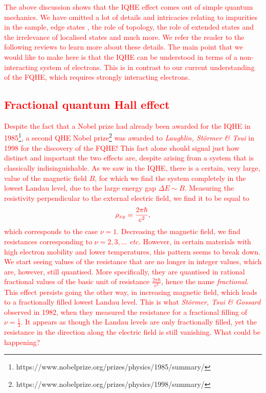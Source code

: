  \textcolor{red}{The above discussion shows that the IQHE effect comes out of simple quantum mechanics. We have omitted a lot of details and intricacies relating to impurities in the sample, edge states \cite{PhysRevB.25.2185}, the role of topology, the role of extended states and the irrelevance of locali\textcolor{red}{s}ed states \cite{PhysRevB.23.5632} and much more. We refer the reader to the following reviews \cite{hep-th/0509216, yoshioka2002the, Girvin} to learn more about these details. The main point that we would like to make here is that the IQHE can be understood in terms of a non-interacting system of electrons. This is in contrast to our current understanding of the FQHE, which requires strongly interacting electrons.}


 \textcolor{red}{\subsection{Fractional quantum Hall effect}}

 \textcolor{red}{Despite the fact that a Nobel prize had already been awarded for the IQHE in 1985\footnote[1]{https://www.nobelprize.org/prizes/physics/1985/summary/}, a second QHE Nobel prize\footnote[2]{https://www.nobelprize.org/prizes/physics/1998/summary/} was awarded to \textit{Laughlin, Störmer \& Tsui} \cite{Laughlin:1983fy, PhysRevLett.48.1559} in 1998 for the discovery of the FQHE! This fact alone should signal just how distinct and important the two effects are, despite arising from a system that is classically indisinguishable. As we saw in the IQHE, there is a certain, very large, value of the magnetic field $B$, for which we find the system completely in the lowest Landau level, due to the large energy gap $\Delta E \sim B$. Measuring the resistivity perpendicular to the external electric field, we find it to be equal to}
\begin{align}
    \textcolor{red}{ \rho_{x y} = \frac{2\pi\hbar}{e^2},}
\end{align}
 \textcolor{red}{ which corresponds to the case $\nu=1$. Decreasing the magnetic field, we find resistances corresponding to $\nu=2,3,...$ \textit{etc.} However, in certain materials with high electron mobility \cite{yoshioka2002the} and lower temperatures, this pattern seems to break down. We start seeing values of the resistance that are  no longer in integer values, which are, however, still quanti\textcolor{red}{s}ed.  More specifically, they are quanti\textcolor{red}{s}ed in rational fractional values of the basic unit of resistance $\frac{2 \pi\hbar}{e^2}$, hence the name \textit{fractional}. This effect persists going the other way, in increasing magnetic field, which leads to a fractionally filled lowest Landau level. This is what \textit{Störmer, Tsui \& Gossard} \cite{PhysRevLett.48.1559} observed in 1982, when they measured the resistance for a fractional filling of $\nu=\frac{1}{3}$. It appears as though the Landau levels are only fractionally filled, yet the resistance in the direction along the electric field is still vanishing. What could be happening?}


